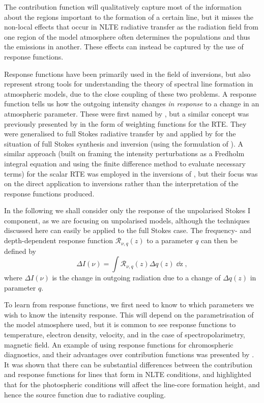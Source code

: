 The contribution function will qualitatively capture most of the information about the regions important to the formation of a certain line, but it misses the non-local effects that occur in NLTE radiative transfer as the radiation field from one region of the model atmosphere often determines the populations and thus the emissions in another.
These effects can instead be captured by the use of response functions.

Response functions have been primarily used in the field of inversions, but also represent strong tools for understanding the theory of spectral line formation in atmospheric models, due to the close coupling of these two problems.
A response function tells us how the outgoing intensity changes \emph{in response} to a change in an atmospheric parameter.
These were first named by \citet{Beckers1975}, but a similar concept was previously presented by \citet{Mein1971} in the form of weighting functions for the RTE.
They were generalised to full Stokes radiative transfer by \citet{LandiDeglInnocenti1977} and applied by \citet{1992RuizCobo} for the situation of full Stokes synthesis and inversion (using the formulation of \citet{SanchezAlmeida1992}).
A similar approach (built on framing the intensity perturbations as a Fredholm integral equation and using the finite difference method to evaluate necessary terms) for the scalar RTE was employed in the inversions of \citet{Metcalf1990a}, but their focus was on the direct application to inversions rather than the interpretation of the response functions produced.

In the following we shall consider only the response of the unpolarised Stokes I component, as we are focusing on unpolarised models, although the techniques discussed here can easily be applied to the full Stokes case.
The frequency- and depth-dependent response function $\mathcal{R}_{\nu, q} (z)$ to a parameter $q$ can then be defined by
\begin{equation}
    \Delta I(\nu) = \int\mathcal{R}_{\nu, q}(z) \Delta q(z) \mathop{\dd{}z},
\end{equation}
where $\Delta I(\nu)$ is the change in outgoing radiation due to a change of $\Delta q(z)$ in parameter $q$.


To learn from response functions, we first need to know to which parameters we wish to know the intensity response.
This will depend on the parametrisation of the model atmosphere used, but it is common to see response functions to temperature, electron density, velocity, and in the case of spectropolarimetry, magnetic field.
An example of using response functions for chromospheric diagnostics, and their advantages over contribution functions was presented by \citet{Uitenbroek2006}.
It was shown that there can be substantial differences between the contribution and response functions for lines that form in NLTE conditions, and highlighted that for \Ha{} the photospheric conditions will affect the line-core formation height, and hence the source function due to radiative coupling.

